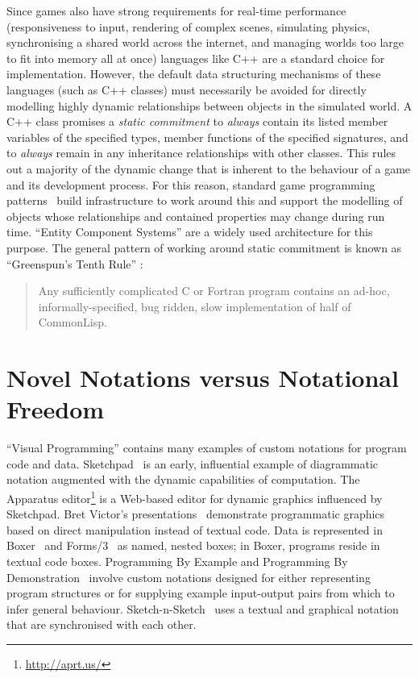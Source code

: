\documentclass[ twoside,openright,titlepage,numbers=noenddot,headinclude,footinclude,cleardoublepage=empty,abstract=on,
                BCOR=5mm,paper=a4,fontsize=11pt
                ]{scrreprt}
\theoremstyle{definition}
\begin{document}
Since games also have strong requirements for real-time performance
(responsiveness to input, rendering of complex scenes, simulating
physics, synchronising a shared world across the internet, and managing
worlds too large to fit into memory all at once) languages like C++ are
a standard choice for implementation. However, the default data
structuring mechanisms of these languages (such as C++ classes) must
necessarily be avoided for directly modelling highly dynamic
relationships between objects in the simulated world. A C++ class
promises a \emph{static commitment} to \emph{always} contain its listed
member variables of the specified types, member functions of the
specified signatures, and to \emph{always} remain in any inheritance
relationships with other classes. This rules out a majority of the
dynamic change that is inherent to the behaviour of a game and its
development process. For this reason, standard game programming
patterns~\parencite{GPP} build infrastructure to work around this and
support the modelling of objects whose relationships and contained
properties may change during run time. ``Entity Component Systems''
\parencite{ECS} are a widely used architecture for this purpose. The
general pattern of working around static commitment is known as
``Greenspun's Tenth Rule'' \parencite{Greenspun10}:

\begin{quote}
Any sufficiently complicated C or Fortran program contains an ad-hoc,
informally-specified, bug ridden, slow implementation of half of
CommonLisp.
\end{quote}

\hypertarget{novel-notations-versus-notational-freedom}{\section{Novel Notations versus Notational
Freedom}\label{novel-notations-versus-notational-freedom}}

``Visual Programming'' contains many examples of custom notations for
program code and data. Sketchpad~\parencite{Sketchpad} is an early,
influential example of diagrammatic notation augmented with the dynamic
capabilities of computation. The Apparatus editor\footnote{\url{http://aprt.us/}}
is a Web-based editor for dynamic graphics influenced by Sketchpad. Bret
Victor's presentations~\parencite{DDV} demonstrate programmatic graphics
based on direct manipulation instead of textual code. Data is
represented in Boxer~\parencite{Boxer} and Forms/3~\parencite{Forms3} as
named, nested boxes; in Boxer, programs reside in textual code boxes.
Programming By Example and Programming By
Demonstration~\parencite{WWID,YWIMC} involve custom notations designed
for either representing program structures or for supplying example
input-output pairs from which to infer general behaviour.
Sketch-n-Sketch~\parencite{SnS} uses a textual and graphical notation
that are synchronised with each other.
\end{document}
